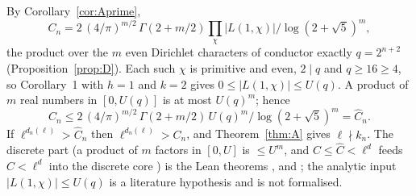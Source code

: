 By Corollary~\ref{cor:Aprime},
\[ C_n=2\,(4/\pi)^{m/2}\,\Gamma(2+m/2)\prod_{\chi}|L(1,\chi)|\big/\log(2+\sqrt5)^m , \]
the product over the $m$ even Dirichlet characters of conductor exactly $q=2^{n+2}$ (Proposition~\ref{prop:D}). Each such $\chi$ is primitive and even, $2\mid q$ and $q\ge16\ge4$, so \cite{Ram04} Corollary~1 with $h=1$ and $k=2$ gives $0\le|L(1,\chi)|\le U(q)$. A product of $m$ real numbers in $[0,U(q)]$ is at most $U(q)^m$; hence
\[ C_n\le2\,(4/\pi)^{m/2}\,\Gamma(2+m/2)\,U(q)^m\big/\log(2+\sqrt5)^m=\widehat C_n . \] If $\ell^{d_n(\ell)}>\widehat C_n$ then $\ell^{d_n(\ell)}>C_n$, and Theorem~\ref{thm:A} gives $\ell\nmid k_n$. The discrete part (a product of $m$ factors in $[0,U]$ is $\le U^m$, and $C\le\widehat C<\ell^d$ feeds $C<\ell^d$ into the discrete core ) is the Lean theorems ,  and ; the analytic input $|L(1,\chi)|\le U(q)$ is a literature hypothesis and is not formalised.
